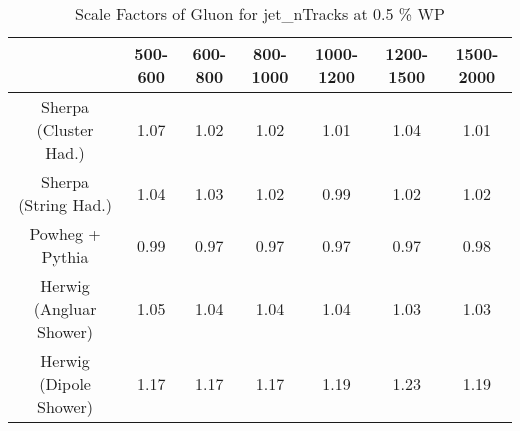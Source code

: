 \begin{table}
\centering
\caption{Scale Factors of Gluon for jet_nTracks at 0.5 \% WP}
\label{tab:SF_MC_jet_nTracks_0.5_Gluon}
\begin{tabular}{ccccccc}
\toprule
{} &  500-600 &  600-800 &  800-1000 &  1000-1200 &  1200-1500 &  1500-2000 \\
\midrule
Sherpa (Cluster Had.)   &     1.07 &     1.02 &      1.02 &       1.01 &       1.04 &       1.01 \\
Sherpa (String Had.)    &     1.04 &     1.03 &      1.02 &       0.99 &       1.02 &       1.02 \\
Powheg + Pythia         &     0.99 &     0.97 &      0.97 &       0.97 &       0.97 &       0.98 \\
Herwig (Angluar Shower) &     1.05 &     1.04 &      1.04 &       1.04 &       1.03 &       1.03 \\
Herwig (Dipole Shower)  &     1.17 &     1.17 &      1.17 &       1.19 &       1.23 &       1.19 \\
\bottomrule
\end{tabular}
\end{table}
